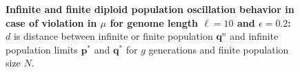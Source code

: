 \begin{figure}[H]
\begin{center}
\hspace{5pt}
\hspace{5pt}


\caption{\textbf{Infinite and finite diploid population oscillation behavior in case of violation in $\mu$ for genome length $\ell = 10$ and $\epsilon = 0.2$:} $d$ is
  distance between infinite or finite population ${\bm q}^n$ and infinite
  population limits ${{\bm p}^\ast}$ and ${{\bm q}^{\ast}}$ for $g$ generations and finite population size $N$.}
\label{oscillation_10d_vio_mu_0.2}
\end{center}
\end{figure}

